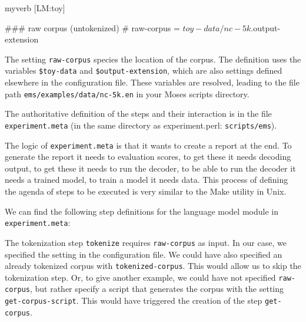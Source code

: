 \begin{SaveVerbatim}{myverb}
 [LM:toy]

 ### raw corpus (untokenized)
 #
 raw-corpus = $toy-data/nc-5k.$output-extension
\end{SaveVerbatim}
\colorbox{gray}{%
}

The setting {\tt raw-corpus} species the location of the corpus. The definition uses the variables {\tt \$toy-data} and {\tt \$output-extension}, which are also settings defined elsewhere in the configuration file. These variables are resolved, leading to the file path {\tt ems/examples/data/nc-5k.en} in your Moses scripts directory.



The authoritative definition of the steps and their interaction is in the file {\tt experiment.meta} (in the same directory as experiment.perl: {\tt scripts/ems}). 



The logic of {\tt experiment.meta} is that it wants to create a report at the end. To generate the report it needs to evaluation scores, to get these it needs decoding output, to get these it needs to run the decoder, to be able to run the decoder it needs a trained model, to train a model it needs data. This process of defining the agenda of steps to be executed is very similar to the Make utility in Unix.



We can find the following step definitions for the language model module in {\tt experiment.meta}:






\colorbox{gray}{%
}

The tokenization step {\tt tokenize} requires {\tt raw-corpus} as input. In our case, we specified the setting in the configuration file. We could have also specified an already tokenized corpus with {\tt tokenized-corpus}. This would allow us to skip the tokenization step. Or, to give another example, we could have not specified {\tt raw-corpus}, but rather specify a script that generates the corpus with the setting {\tt get-corpus-script}. This would have triggered the creation of the step {\tt get-corpus}.



